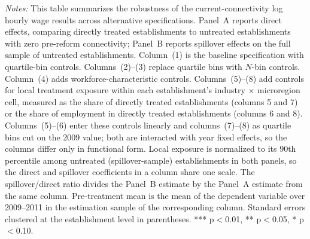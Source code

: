 \begin{table}[H]
\begin{minipage}{\linewidth}
    \textit{Notes:} This table summarizes the robustness of the current-connectivity log hourly wage results across alternative specifications. Panel~A reports direct effects, comparing directly treated establishments to untreated establishments with zero pre-reform connectivity; Panel~B reports spillover effects on the full sample of untreated establishments. Column~(1) is the baseline specification with quartile-bin controls. Columns~(2)--(3) replace quartile bins with $N$-bin controls. Column~(4) adds workforce-characteristic controls. Columns~(5)--(8) add controls for local treatment exposure within each establishment's industry $\times$ microregion cell, measured as the share of directly treated establishments (columns 5 and 7) or the share of employment in directly treated establishments (columns 6 and 8). Columns~(5)--(6) enter these controls linearly and columns~(7)--(8) as quartile bins cut on the 2009 value; both are interacted with year fixed effects, so the columns differ only in functional form. Local exposure is normalized to its 90th percentile among untreated (spillover-sample) establishments in both panels, so the direct and spillover coefficients in a column share one scale. The spillover/direct ratio divides the Panel~B estimate by the Panel~A estimate from the same column. Pre-treatment mean is the mean of the dependent variable over 2009--2011 in the estimation sample of the corresponding column. Standard errors clustered at the establishment level in parentheses. *** p$<$0.01, ** p$<$0.05, * p$<$0.10.
\end{minipage}
\end{table}
